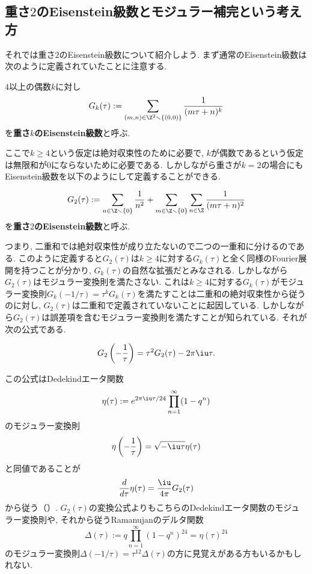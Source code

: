 \documentclass[11pt,b5paper,oneside,lualatex]{ltjsarticle} %
\numberwithin{equation}{section} %
\begin{document}

\subsection{重さ$ 2 $のEisenstein級数とモジュラー補完という考え方} \label{subsec:modular_completion}


それでは重さ$ 2 $のEisenstein級数について紹介しよう. 
まず通常のEisenstein級数は次のように定義されていたことに注意する. 

\begin{dfn}
	$ 4 $以上の偶数$ k $に対し
	\[
	G_k (\tau) := \sum_{(m, n) \in \Z^2 \smallsetminus \{ (0, 0) \}} \frac{1}{(m\tau + n)^k}
	\]
	を\textbf{重さ$ k $のEisenstein級数}と呼ぶ. 
\end{dfn}

ここで$ k \ge 4 $という仮定は絶対収束性のために必要で, $ k $が偶数であるという仮定は無限和が$ 0 $にならないために必要である. 
しかしながら重さが$ k=2 $の場合にもEisenstein級数を以下のようにして定義することができる. 

\begin{dfn}
	\[
	G_2 (\tau) := 
	\sum_{n \in \Z \smallsetminus \{ 0 \}} \frac{1}{n^2} 
	+ \sum_{m \in \Z \smallsetminus \{ 0 \}} \sum_{n \in \Z} \frac{1}{(m\tau + n)^2}
	\]
	を\textbf{重さ$ 2 $のEisenstein級数}と呼ぶ. 
\end{dfn}

つまり, 二重和では絶対収束性が成り立たないので二つの一重和に分けるのである. 
このように定義すると$ G_2 (\tau) $は$ k \ge 4 $に対する$ G_k (\tau) $と全く同様のFourier展開を持つことが分かり, $ G_k (\tau) $の自然な拡張だとみなされる. 
しかしながら$ G_2 (\tau) $はモジュラー変換則を満たさない. 
これは$ k \ge 4 $に対する$ G_k (\tau) $がモジュラー変換則$ G_k (-1/\tau) = \tau^k G_k(\tau) $を満たすことは二重和の絶対収束性から従うのに対し, $ G_2 (\tau) $は二重和で定義されていないことに起因している. 
しかしながら$ G_2 (\tau) $は誤差項を含むモジュラー変換則を満たすことが知られている. 
それが次の公式である. 

\begin{prop}
	\label{prop:G_2}
	\[
	G_2 \left( -\frac{1}{\tau} \right) = \tau^2 G_2(\tau) - 2\pi \iu \tau.
	\]
\end{prop}

\begin{rem}
	この公式はDedekindエータ関数
	\[
	\eta(\tau) := e^{2\pi\iu\tau/24}
	\prod_{n=1}^{\infty} (1-q^n)
	\]
	のモジュラー変換則
	\[
	\eta \left( -\frac{1}{\tau} \right)
	=
	\sqrt{-\iu \tau} \eta (\tau)
	\]
	と同値であることが
	\[
	\frac{d}{d\tau} \eta(\tau)
	=
	\frac{\iu}{4\pi} G_2(\tau)
	\]
	から従う（\cite[Proposition 1.2.5]{DS}）. 
	$ G_2 (\tau) $の変換公式よりもこちらのDedekindエータ関数のモジュラー変換則や, それから従うRamanujanのデルタ関数
	\[
	\Delta(\tau) := q \prod_{n=1}^{\infty} (1-q^n)^{24}
	= \eta(\tau)^{24}
	\]
	のモジュラー変換則$ \Delta(-1/\tau) = \tau^{12} \Delta(\tau) $の方に見覚えがある方もいるかもしれない. 
\end{rem}
\end{document}
